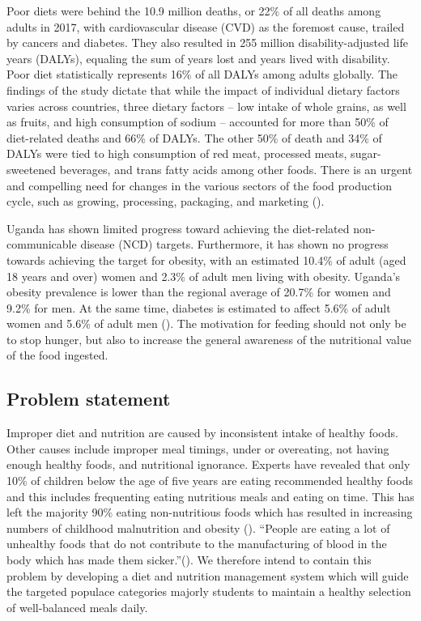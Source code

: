 \documentclass{article}
\begin{document}
Poor diets were behind the 10.9 million deaths, or 22\% of all deaths among adults in 2017, with cardiovascular disease (CVD) as the foremost cause, trailed by cancers and diabetes. They also resulted in 255 million disability-adjusted life years (DALYs), equaling the sum of years lost and years lived with disability. Poor diet statistically represents 16\% of all DALYs among adults globally. The findings of the study dictate that while the impact of individual dietary factors varies across countries, three dietary factors – low intake of whole grains, as well as fruits, and high consumption of sodium – accounted for more than 50\% of diet-related deaths and 66\% of DALYs. The other 50\% of death and 34\% of DALYs were tied to high consumption of red meat, processed meats, sugar-sweetened beverages, and trans fatty acids among other foods. There is an urgent and compelling need for changes in the various sectors of the food production cycle, such as growing, processing, packaging, and marketing (\cite{ihme2019new}).

Uganda has shown limited progress toward achieving the diet-related non-communicable disease (NCD) targets. Furthermore, it has shown no progress towards achieving the target for obesity, with an estimated 10.4\% of adult (aged 18 years and over) women and 2.3\% of adult men living with obesity. Uganda's obesity prevalence is lower than the regional average of 20.7\% for women and 9.2\% for men. At the same time, diabetes is estimated to affect 5.6\% of adult women and 5.6\% of adult men (\cite{globalnutritionreportn.d.}). The motivation for feeding should not only be to stop hunger, but also to increase the general awareness of the nutritional value of the food ingested.

\subsection{Problem statement}
Improper diet and nutrition are caused by inconsistent intake of healthy foods. Other causes include improper meal timings, under or overeating, not having enough healthy foods, and nutritional ignorance. Experts have revealed that only 10\% of children below the age of five years are eating recommended healthy foods and this includes frequenting eating nutritious meals and eating on time. This has left the majority 90\% eating non-nutritious foods which has resulted in increasing numbers of childhood malnutrition and obesity (\cite{tumwine2022only}). “People are eating a lot of unhealthy foods that do not contribute to the manufacturing of blood in the body which has made them sicker.”(\cite{tumwine2022only}). We therefore intend to contain this problem by developing a diet and nutrition management system which will guide the targeted populace categories majorly students to maintain a healthy selection of well-balanced meals daily.
\end{document}
